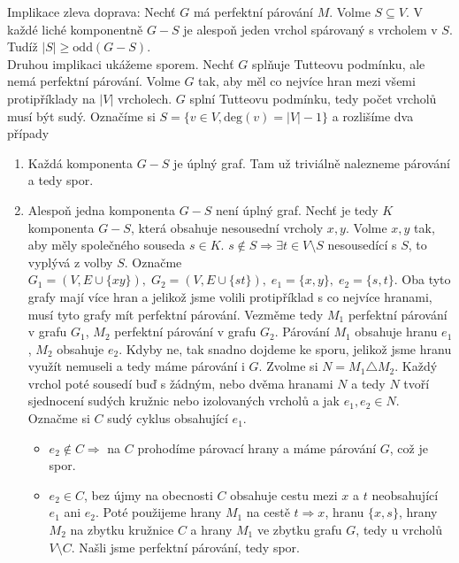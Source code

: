 \begin{t_proof}
  Implikace zleva doprava: Nechť $G$ má perfektní párování $M$. Volme $S \subseteq V$. V každé liché komponentně $G-S$ je alespoň jeden vrchol spárovaný s vrcholem v $S$. Tudíž $|S| \geq \mathrm{odd}(G-S)$. \\
  Druhou implikaci ukážeme sporem. Nechť $G$ splňuje Tutteovu podmínku, ale nemá perfektní párování. Volme $G$ tak, aby měl co nejvíce hran mezi všemi protipříklady na $|V|$ vrcholech. $G$ splní Tutteovu podmínku, tedy počet vrcholů musí být sudý. Označíme si $S = \{v \in V, \mathrm{deg}(v) = |V| - 1 \}$ a rozlišíme dva případy
  \begin{enumerate}
    \item Každá komponenta $G-S$ je úplný graf. Tam už triviálně nalezneme párování a tedy spor.
	\item Alespoň jedna komponenta $G-S$ není úplný graf. Nechť je tedy $K$ komponenta $G-S$, která obsahuje nesousední vrcholy $x,y$. Volme $x,y$ tak, aby měly společného souseda $s \in K$. $s \not\in S \Rightarrow \exists t \in V \setminus S$ nesousedící s $S$, to vyplývá z volby $S$. Označme $G_1 = (V, E \cup \{xy\}), \; G_2 = (V, E \cup \{st\}), \; e_1 = \{x,y\}, \; e_2 = \{s,t\}$. Oba tyto grafy mají více hran a jelikož jsme volili protipříklad s co nejvíce hranami, musí tyto grafy mít perfektní párování. Vezměme tedy $M_1$ perfektní párování v grafu $G_1$, $M_2$ perfektní párování v grafu $G_2$. Párování $M_1$ obsahuje hranu $e_1$, $M_2$ obsahuje $e_2$. Kdyby ne, tak snadno dojdeme ke sporu, jelikož jsme hranu využít nemuseli a tedy máme párování i $G$. Zvolme si $N = M_1 \triangle M_2$. Každý vrchol poté sousedí buď s žádným, nebo dvěma hranami $N$ a tedy $N$ tvoří sjednocení sudých kružnic nebo izolovaných vrcholů a jak $e_1, e_2 \in N$. Označme si $C$ sudý cyklus obsahující $e_1$.
	\begin{itemize}
      \item $e_2 \not\in C \Rightarrow$ na $C$ prohodíme párovací hrany a máme párování $G$, což je spor.
	  \item $e_2 \in C$, bez újmy na obecnosti $C$ obsahuje cestu mezi $x$ a $t$ neobsahující $e_1$ ani $e_2$. Poté použijeme hrany $M_1$ na cestě $t\Rightarrow x$, hranu $\{x,s\}$, hrany $M_2$ na zbytku kružnice $C$ a hrany $M_1$ ve zbytku grafu $G$, tedy u vrcholů $V \setminus C$. Našli jsme perfektní párování, tedy spor.
	\end{itemize}
  \end{enumerate}
\end{t_proof}

